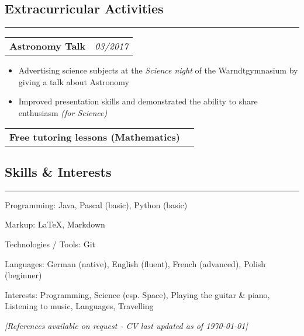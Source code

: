 \documentclass[10pt,letterpaper]{article}
\makeatletter
\newcommand{\headerrow}[2]
{\begin{tabular*}{\linewidth}{l@{\extracolsep{\fill}}r}
	#1 &
	#2 \\
\end{tabular*}}
\makeatother
\begin{document}

\subsection*{Extracurricular Activities}
\hrule
\vspace{0.4em}

\noindent
\headerrow{\textbf{Astronomy Talk}}{\emph{03/2017}}
\vspace{-1.6em}
\begin{itemize}
    \setlength\itemsep{0em}
    \item Advertising science subjects at the \emph{Science night} of the Warndtgymnasium by giving a talk about Astronomy
    \item Improved presentation skills and demonstrated the ability to share enthusiasm \emph{(for Science)}
\end{itemize}

\noindent
\headerrow{\textbf{Free tutoring lessons (Mathematics)}}{}


\subsection*{Skills \& Interests}
\hrule
\vspace{0.4em}
\begin{description*}
	\item[Programming:]
	Java, Pascal (basic), Python (basic)
    	\item[Markup:]
    	\LaTeX, Markdown
	\item[Technologies / Tools:]
	Git
	\item[Languages:]
	German (native), English (fluent), French (advanced), Polish (beginner)
   	\item[Interests:]
	Programming, Science (esp. Space), Playing the guitar \& piano, Listening to music, Languages, Travelling
\end{description*}



\hfill \small \textit{[References available on request - CV last updated as of {\today}]}
\end{document}

